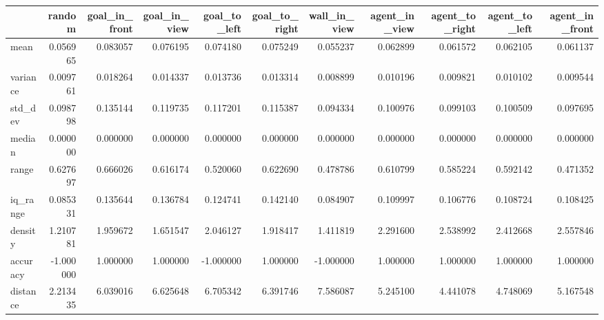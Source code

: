 \begin{tabular}{lrrrrrrrrrr}
\toprule
 & random & goal\_in\_front & goal\_in\_view & goal\_to\_left & goal\_to\_right & wall\_in\_view & agent\_in\_view & agent\_to\_right & agent\_to\_left & agent\_in\_front \\
\midrule
mean & 0.056965 & 0.083057 & 0.076195 & 0.074180 & 0.075249 & 0.055237 & 0.062899 & 0.061572 & 0.062105 & 0.061137 \\
variance & 0.009761 & 0.018264 & 0.014337 & 0.013736 & 0.013314 & 0.008899 & 0.010196 & 0.009821 & 0.010102 & 0.009544 \\
std\_dev & 0.098798 & 0.135144 & 0.119735 & 0.117201 & 0.115387 & 0.094334 & 0.100976 & 0.099103 & 0.100509 & 0.097695 \\
median & 0.000000 & 0.000000 & 0.000000 & 0.000000 & 0.000000 & 0.000000 & 0.000000 & 0.000000 & 0.000000 & 0.000000 \\
range & 0.627697 & 0.666026 & 0.616174 & 0.520060 & 0.622690 & 0.478786 & 0.610799 & 0.585224 & 0.592142 & 0.471352 \\
iq\_range & 0.085331 & 0.135644 & 0.136784 & 0.124741 & 0.142140 & 0.084907 & 0.109997 & 0.106776 & 0.108724 & 0.108425 \\
density & 1.210781 & 1.959672 & 1.651547 & 2.046127 & 1.918417 & 1.411819 & 2.291600 & 2.538992 & 2.412668 & 2.557846 \\
accuracy & -1.000000 & 1.000000 & 1.000000 & -1.000000 & 1.000000 & -1.000000 & 1.000000 & 1.000000 & 1.000000 & 1.000000 \\
distance & 2.213435 & 6.039016 & 6.625648 & 6.705342 & 6.391746 & 7.586087 & 5.245100 & 4.441078 & 4.748069 & 5.167548 \\
\bottomrule
\end{tabular}
